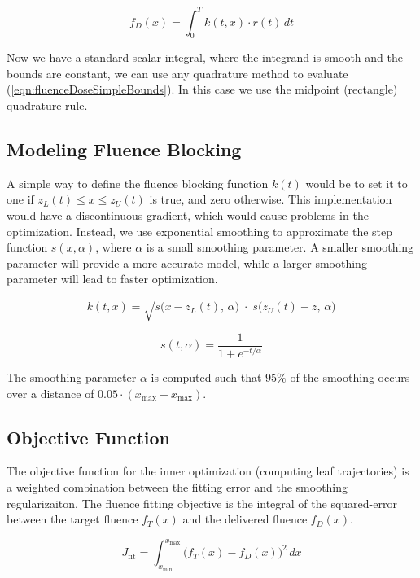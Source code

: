 \begin{equation}
  f_D(x) = \int_0^T \! k(t, x) \cdot r(t) \, dt
  \label{eqn:fluenceDoseSimpleBounds}
\end{equation}

Now we have a standard scalar integral, where the integrand is smooth and the
bounds are constant, we can use any quadrature method to evaluate (\ref{eqn:fluenceDoseSimpleBounds}).
In this case we use the midpoint (rectangle) quadrature rule.

\subsection{Modeling Fluence Blocking}
\label{sec:modelingFluenceBlocking}

A simple way to define the fluence blocking function $k(t)$
would be to set it to one if $z_L(t) \leq x \leq z_U(t)$
is true, and zero otherwise.
This implementation would have a discontinuous gradient, which would cause problems in the optimization.
Instead, we use exponential smoothing to approximate the step function $s(x,\alpha)$,
where $\alpha$ is a small smoothing parameter.
A smaller smoothing parameter will provide a more accurate model,
while a larger smoothing parameter will lead to faster optimization.

\begin{equation}
  k(t, x) = \sqrt{s\big(x - z_L(t), \, \alpha\big) \; \cdot \; s\big(z_U(t) - z, \, \alpha\big)}
\end{equation}

\begin{equation}
  s(t, \alpha) = \frac{1}{1 + e^{-t/\alpha}}
\end{equation}

The smoothing parameter $\alpha$ is computed such that $95\%$ of the smoothing occurs over a
distance of $0.05 \cdot (x_\text{max} - x_\text{max})$.

\subsection{Objective Function}

The objective function for the inner optimization (computing leaf trajectories)
is a weighted combination between the fitting error and the smoothing regularizaiton.
The fluence fitting objective is the integral of the squared-error
between the target fluence $f_T(x)$ and the delivered fluence $f_D(x)$.

\begin{equation}
  J_\text{fit} = \int_{x_\text{min}}^{x_\text{max}} \! \big( f_T(x) - f_D(x) \big)^2 \,dx
\end{equation}

